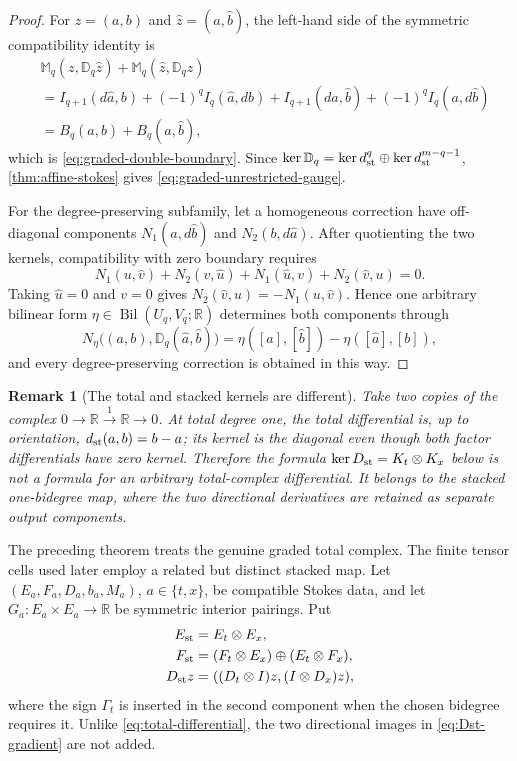 \documentclass[11pt,a4paper]{article}
\newtheorem{remark}[theorem]{Remark}
\newcommand{\R}{\mathbb R}
\begin{document}
\begin{proof}
For \(z=(a,b)\) and \(\widehat z=(\widehat a,\widehat b)\), the left-hand
side of the symmetric compatibility identity is
\begin{align*}
 &\mathbb M_q(z,\mathbb D_q\widehat z)
  +\mathbb M_q(\widehat z,\mathbb D_qz)\\
 &=I_{q+1}(d\widehat a,b)+(-1)^qI_q(\widehat a,db)
  +I_{q+1}(da,\widehat b)+(-1)^qI_q(a,d\widehat b)\\
 &=B_q(\widehat a,b)+B_q(a,\widehat b),
\end{align*}
which is \cref{eq:graded-double-boundary}.  Since
\(\ker\mathbb D_q=\ker d_{\rm st}^q\oplus
\ker d_{\rm st}^{m-q-1}\), \cref{thm:affine-stokes} gives
\cref{eq:graded-unrestricted-gauge}.

For the degree-preserving subfamily, let a homogeneous correction have
off-diagonal components \(N_1(a,d\widehat b)\) and
\(N_2(b,d\widehat a)\).  After quotienting the two kernels, compatibility
with zero boundary requires
\[
 N_1(u,\widehat v)+N_2(v,\widehat u)
 +N_1(\widehat u,v)+N_2(\widehat v,u)=0.
\]
Taking \(\widehat u=0\) and \(v=0\) gives
\(N_2(\widehat v,u)=-N_1(u,\widehat v)\).  Hence one arbitrary bilinear
form \(\eta\in\operatorname{Bil}(U_q,V_q;\mathbb R)\) determines both
components through
\begin{equation}\label{eq:graded-homogeneous-correction}
 N_\eta\bigl((a,b),\mathbb D_q(\widehat a,\widehat b)\bigr)
 =\eta([a],[\widehat b])-\eta([\widehat a],[b]),
\end{equation}
and every degree-preserving correction is obtained in this way.
\end{proof}

\begin{remark}[The total and stacked kernels are different]
\label{rem:total-versus-stacked}
Take two copies of the complex
\(0\to\mathbb R\xrightarrow{1}\mathbb R\to0\).  At total degree one,
the total differential is, up to orientation,
\(d_{\rm st}(a,b)=b-a\); its kernel is the diagonal even though both
factor differentials have zero kernel.  Therefore the formula
\(\ker D_{\rm st}=K_t\otimes K_x\) below is not a formula for an arbitrary
total-complex differential.  It belongs to the stacked one-bidegree map,
where the two directional derivatives are retained as separate output
components.
\end{remark}

The preceding theorem treats the genuine graded total complex.  The
finite tensor cells used later employ a related but distinct stacked map.
Let
\((E_a,F_a,D_a,b_a,M_a)\), \(a\in\{t,x\}\), be compatible Stokes data,
and let \(G_a:E_a\times E_a\to\R\) be symmetric interior pairings.  Put
\begin{align}
 E_{\rm st}&=E_t\otimes E_x,\label{eq:Est}\\
 F_{\rm st}&=(F_t\otimes E_x)\oplus(E_t\otimes F_x),\label{eq:Fst}\\
 D_{\rm st}z&=((D_t\otimes I)z,(I\otimes D_x)z),\label{eq:Dst-gradient}
\end{align}
where the sign \(\Gamma_t\) is inserted in the second component when the
chosen bidegree requires it.  Unlike \cref{eq:total-differential}, the two
directional images in \cref{eq:Dst-gradient} are not added.
\end{document}
